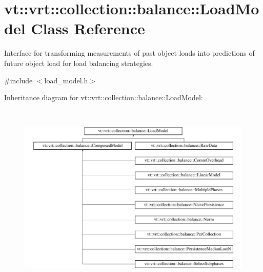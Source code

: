 \hypertarget{classvt_1_1vrt_1_1collection_1_1balance_1_1_load_model}{}\section{vt\+:\+:vrt\+:\+:collection\+:\+:balance\+:\+:Load\+Model Class Reference}
\label{classvt_1_1vrt_1_1collection_1_1balance_1_1_load_model}


Interface for transforming measurements of past object loads into predictions of future object load for load balancing strategies.  




{\ttfamily \#include $<$load\+\_\+model.\+h$>$}

Inheritance diagram for vt\+:\+:vrt\+:\+:collection\+:\+:balance\+:\+:Load\+Model\+:\begin{figure}[H]
\begin{center}
\leavevmode
\includegraphics[height=9.090909cm]{classvt_1_1vrt_1_1collection_1_1balance_1_1_load_model}
\end{center}
\end{figure}
